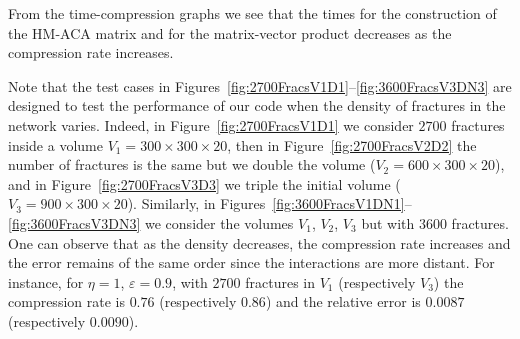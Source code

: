 From the time-compression graphs we see that the times for the construction of the HM-ACA matrix and for the matrix-vector product decreases as the compression rate increases.

Note that the test cases in Figures~\ref{fig:2700FracsV1D1}--\ref{fig:3600FracsV3DN3} are designed to test the performance of our code when the density of fractures in the network varies. Indeed, in Figure~\ref{fig:2700FracsV1D1} we consider $2700$ fractures inside a volume $V_1=300\times300\times20$, then in Figure~\ref{fig:2700FracsV2D2} the number of fractures is the same but we double the volume ($V_2=600\times300\times20$), and in Figure~\ref{fig:2700FracsV3D3} we triple the initial volume ($V_3=900\times300\times20$). Similarly, in Figures~\ref{fig:3600FracsV1DN1}--\ref{fig:3600FracsV3DN3} we consider the volumes $V_1$, $V_2$, $V_3$ but with $3600$ fractures. One can observe that as the density decreases, the compression rate increases and the error remains of the same order since the interactions are more distant.
For instance, for $\eta=1$, $\varepsilon=0.9$, with $2700$ fractures in $V_1$ (respectively $V_3$) the compression rate is $0.76$ (respectively $0.86$) and the relative error is $0.0087$ (respectively $0.0090$).



